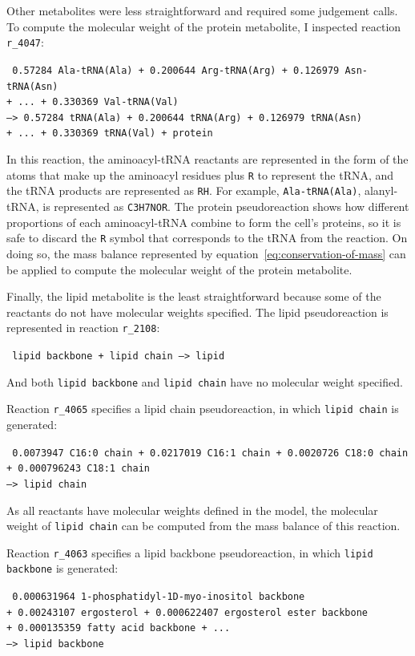 Other metabolites were less straightforward and required some judgement calls.
To compute the molecular weight of the protein metabolite, I inspected reaction \texttt{r\_4047}:

\texttt{
  0.57284 Ala-tRNA(Ala) + 0.200644 Arg-tRNA(Arg) + 0.126979 Asn-tRNA(Asn)\\
  + ... + 0.330369 Val-tRNA(Val) \\
  --> 0.57284 tRNA(Ala) + 0.200644 tRNA(Arg) + 0.126979 tRNA(Asn) \\
  + ... + 0.330369 tRNA(Val) + protein
}

In this reaction, the aminoacyl-tRNA reactants are represented in the form of the atoms that make up the aminoacyl residues plus \texttt{R} to represent the tRNA, and the tRNA products are represented as \texttt{RH}.
For example, \texttt{Ala-tRNA(Ala)}, alanyl-tRNA, is represented as \texttt{C3H7NOR}.
The protein pseudoreaction shows how different proportions of each aminoacyl-tRNA combine to form the cell's proteins, so it is safe to discard the \texttt{R} symbol that corresponds to the tRNA from the reaction.
On doing so, the mass balance represented by equation~\ref{eq:conservation-of-mass} can be applied to compute the molecular weight of the protein metabolite.

Finally, the lipid metabolite is the least straightforward because some of the reactants do not have molecular weights specified.
The lipid pseudoreaction is represented in reaction \texttt{r\_2108}:

\texttt{
  lipid backbone + lipid chain --> lipid
}

And both \texttt{lipid backbone} and \texttt{lipid chain} have no molecular weight specified.

Reaction \texttt{r\_4065} specifies a lipid chain pseudoreaction, in which \texttt{lipid chain} is generated:

\texttt{
  0.0073947 C16:0 chain + 0.0217019 C16:1 chain + 0.0020726 C18:0 chain \\
  + 0.000796243 C18:1 chain \\
  --> lipid chain
}

As all reactants have molecular weights defined in the model, the molecular weight of \texttt{lipid chain} can be computed from the mass balance of this reaction.

Reaction \texttt{r\_4063} specifies a lipid backbone pseudoreaction, in which \texttt{lipid backbone} is generated:

\texttt{
  0.000631964 1-phosphatidyl-1D-myo-inositol backbone\\
  + 0.00243107 ergosterol + 0.000622407 ergosterol ester backbone\\
  + 0.000135359 fatty acid backbone + ...\\
  --> lipid backbone
}

